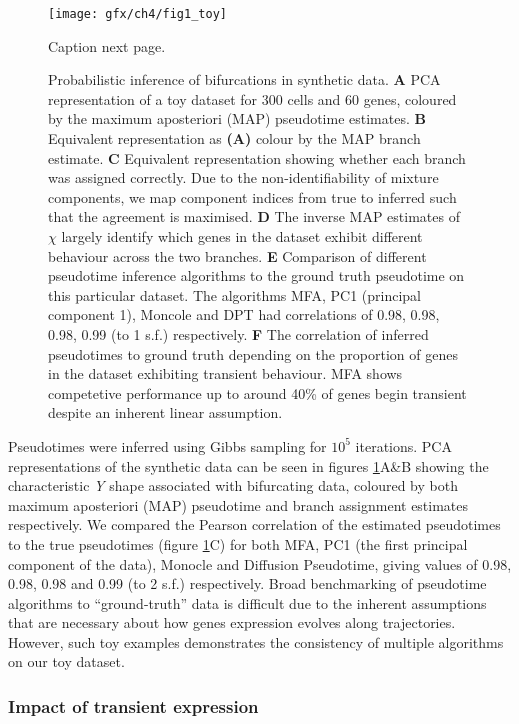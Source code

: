 \begin{figure}
	\centering
	\texttt{[image: gfx/ch4/fig1\_toy]}
 \caption{Caption next page.}\label{fig:toy}
\end{figure}
\addtocounter{figure}{-1}
\begin{figure}
\caption{Probabilistic inference of bifurcations in synthetic data. 
\textbf{A} PCA representation of a toy dataset for 300 cells and 60 genes, coloured by the maximum aposteriori (MAP) pseudotime estimates.
\textbf{B} Equivalent representation as \textbf{(A)} colour by the MAP branch estimate.
\textbf{C} Equivalent representation showing whether each branch was assigned correctly. Due to the non-identifiability of mixture components, we map component indices from true to inferred such that the agreement is maximised.
\textbf{D} The inverse MAP estimates of $\chi$ largely identify which genes in the dataset exhibit different behaviour across the two branches.
\textbf{E} Comparison of different pseudotime inference algorithms to the ground truth pseudotime on this particular dataset. The algorithms MFA, PC1 (principal component 1), Moncole and DPT had correlations of 0.98, 0.98, 0.98, 0.99 (to 1 s.f.) respectively.
\textbf{F} The correlation of inferred pseudotimes to ground truth depending on the proportion of genes in the dataset exhibiting transient behaviour. MFA shows competetive performance up to around 40\% of genes begin transient despite an inherent linear assumption.}
\end{figure}

Pseudotimes were inferred using Gibbs sampling for $10^5$ iterations. PCA representations of the synthetic data can be seen in figures \ref{fig:toy}A\&B showing the characteristic \emph{Y} shape associated with bifurcating data, coloured by both maximum aposteriori (MAP) pseudotime and branch assignment estimates respectively. We compared the Pearson correlation of the estimated pseudotimes to the true pseudotimes (figure \ref{fig:toy}C) for both MFA, PC1 (the first principal component of the data), Monocle and Diffusion Pseudotime, giving values of 0.98, 0.98, 0.98 and 0.99 (to 2 s.f.) respectively. Broad benchmarking of pseudotime algorithms to ``ground-truth'' data is difficult due to the inherent assumptions that are necessary about how genes expression evolves along trajectories. However, such toy examples demonstrates the consistency of multiple algorithms on our toy dataset.

\subsubsection{Impact of transient expression}

